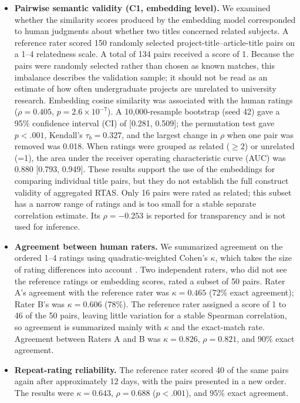 \documentclass[pdflatex,sn-apa]{sn-jnl}
\begin{document}
\begin{itemize}
\item \textbf{Pairwise semantic validity (C1, embedding level).} We examined whether the similarity scores produced by the embedding model corresponded to human judgments about whether two titles concerned related subjects. A reference rater scored 150 randomly selected project-title--article-title pairs on a 1--4 relatedness scale. A total of 134 pairs received a score of 1. Because the pairs were randomly selected rather than chosen as known matches, this imbalance describes the validation sample; it should not be read as an estimate of how often undergraduate projects are unrelated to university research. Embedding cosine similarity was associated with the human ratings ($\rho=0.405$, $p=2.6\times10^{-7}$). A 10,000-resample bootstrap (seed 42) gave a 95\% confidence interval (CI) of [0.281, 0.509]; the permutation test gave $p<.001$, Kendall's $\tau_b=0.327$, and the largest change in $\rho$ when one pair was removed was 0.018. When ratings were grouped as related ($\geq2$) or unrelated (=1), the area under the receiver operating characteristic curve (AUC) was 0.880 [0.793, 0.949]. These results support the use of the embeddings for comparing individual title pairs, but they do not establish the full construct validity of aggregated RTAS. Only 16 pairs were rated as related; this subset has a narrow range of ratings and is too small for a stable separate correlation estimate. Its $\rho=-0.253$ is reported for transparency and is not used for inference.

\item \textbf{Agreement between human raters.} We summarized agreement on the ordered 1--4 ratings using quadratic-weighted Cohen's $\kappa$, which takes the size of rating differences into account \citep{cohen1968weighted}. Two independent raters, who did not see the reference ratings or embedding scores, rated a subset of 50 pairs. Rater A's agreement with the reference rater was $\kappa=0.465$ (72\% exact agreement); Rater B's was $\kappa=0.606$ (78\%). The reference rater assigned a score of 1 to 46 of the 50 pairs, leaving little variation for a stable Spearman correlation, so agreement is summarized mainly with $\kappa$ and the exact-match rate. Agreement between Raters A and B was $\kappa=0.826$, $\rho=0.821$, and 90\% exact agreement.

\item \textbf{Repeat-rating reliability.} The reference rater scored 40 of the same pairs again after approximately 12 days, with the pairs presented in a new order. The results were $\kappa=0.643$, $\rho=0.688$ ($p<.001$), and 95\% exact agreement.


\end{itemize}
\end{document}
